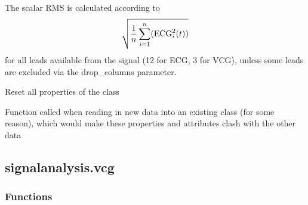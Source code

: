 \documentclass[letterpaper,10pt,english]{sphinxmanual}
\begin{document}
\begin{fulllineitems}
\begin{fulllineitems}
\sphinxAtStartPar
The scalar RMS is calculated according to
\begin{equation*}
\begin{split}\sqrt{ \frac{1}{n}\sum_{i=1}^n (\textnormal{ECG}_i^2(t)) }\end{split}
\end{equation*}
\sphinxAtStartPar
for all leads available from the signal (12 for ECG, 3 for VCG), unless some leads are excluded via the
drop\_columns parameter.

\end{fulllineitems}


\begin{fulllineitems}
\label{\detokenize{_autosummary/signalanalysis.general.Signal:signalanalysis.general.Signal.reset}}
\sphinxAtStartPar
Reset all properties of the class

\sphinxAtStartPar
Function called when reading in new data into an existing class (for some reason), which would make these
properties and attributes clash with the other data

\end{fulllineitems}


\end{fulllineitems}



\subsection{signalanalysis.vcg}
\label{\detokenize{_autosummary/signalanalysis.vcg:module-signalanalysis.vcg}}\label{\detokenize{_autosummary/signalanalysis.vcg:signalanalysis-vcg}}\label{\detokenize{_autosummary/signalanalysis.vcg::doc}}\subsubsection*{Functions}
\end{document}
